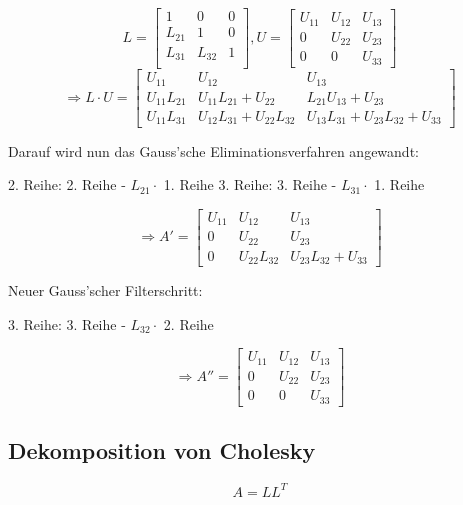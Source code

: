 \documentclass[11pt]{article} %
\theoremstyle{definition}
\begin{document}
\[
L = \begin{bmatrix}
1 & 0 & 0 \\
L_{21} & 1 & 0 \\
L_{31} & L_{32} & 1 \\
\end{bmatrix}, U = \begin{bmatrix}
U_{11} & U_{12} & U_{13} \\
0 & U_{22} & U_{23} \\
0 & 0 & U_{33}
\end{bmatrix}
\]
\[
\Rightarrow L\cdot U = \begin{bmatrix}
U_{11} & U_{12} & U_{13} \\
U_{11} L_{21} & U_{11} L_{21} + U_{22} & L_{21} U_{13} + U_{23} \\
U_{11} L_{31} & U_{12} L_{31} + U_{22} L_{32} & U_{13} L_{31} + U_{23} L_{32} + U_{33}
\end{bmatrix}
\]

Darauf wird nun das Gauss'sche Eliminationsverfahren angewandt:

2. Reihe: 2. Reihe - $L_{21}\cdot$ 1. Reihe
3. Reihe: 3. Reihe - $L_{31}\cdot$ 1. Reihe

\[
\Rightarrow A' = \begin{bmatrix}
U_{11} & U_{12}  & U_{13} \\
0 & U_{22} & U_{23} \\
0 & U_{22}L_{32} & U_{23}L_{32} + U_{33}
\end{bmatrix}
\]

Neuer Gauss'scher Filterschritt:

3. Reihe: 3. Reihe - $L_{32}\cdot$ 2. Reihe

\[
\Rightarrow A'' = \begin{bmatrix}
U_{11} & U_{12}  & U_{13} \\
0 & U_{22} & U_{23} \\
0 & 0 & U_{33}
\end{bmatrix}
\]

\subsection{Dekomposition von Cholesky}

\[
A= LL^T
\]
\end{document}
